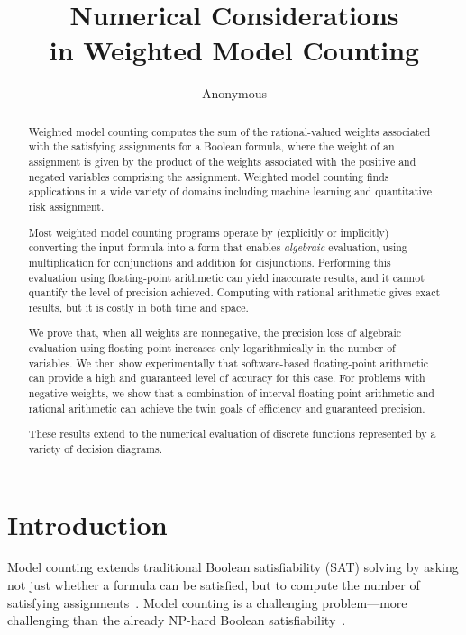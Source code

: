 \documentclass[letterpaper,USenglish,cleveref, autoref, thm-restate]{lipics-v2021}
\title{Numerical Considerations \\in Weighted Model Counting}
\author{Anonymous}{Unknown Institution}{}{}{}
\begin{document}
\maketitle

\begin{abstract}
 Weighted model counting computes the sum of the rational-valued weights
  associated with the satisfying assignments for a Boolean formula,
  where the weight of an assignment is given by the product of the
  weights associated with the positive and negated variables
  comprising the assignment.  Weighted model counting finds
  applications in a wide variety of domains including machine learning
  and quantitative risk assignment.

  Most weighted model counting programs operate by (explicitly or
  implicitly) converting the input formula into a form that enables
  \emph{algebraic} evaluation, using multiplication for conjunctions
  and addition for disjunctions.  Performing this evaluation using
  floating-point arithmetic can yield inaccurate results, and it
  cannot quantify the level of precision achieved.  Computing with
  rational arithmetic gives exact results, but it is costly in both
  time and space.

  We prove that, when all weights are nonnegative, the precision loss of
  algebraic evaluation using floating point increases only
  logarithmically in the number of variables.  We then show experimentally
  that software-based floating-point arithmetic can provide
  a high and guaranteed level of accuracy for this case.  For problems
  with negative weights, we show that a combination of interval
  floating-point arithmetic and rational arithmetic can achieve the
  twin goals of efficiency and guaranteed precision.

  These results extend to the numerical evaluation of discrete functions represented by a variety of decision diagrams.

\end{abstract}

\section{Introduction}

Model counting extends traditional Boolean satisfiability (SAT) solving by
asking not just whether a formula can be satisfied, but to compute the
number of satisfying assignments~\cite{gomes:hs:2009}.  Model counting is a challenging
problem---more challenging than the already NP-hard Boolean
satisfiability~\cite{valiant:siam:1979}.
\end{document}
